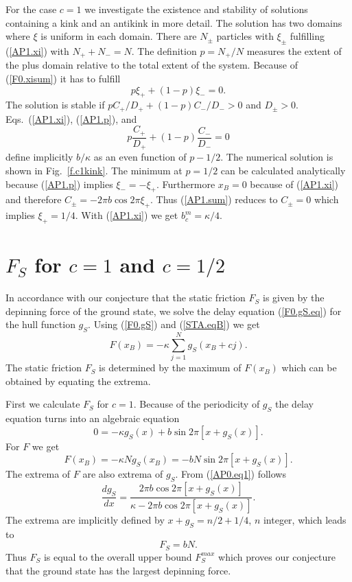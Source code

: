For the case $c=1$ we investigate the existence and stability of
solutions containing a kink and an antikink in more detail. The
solution has two domains where $\xi$ is uniform in each
domain. There are $N_\pm$ particles with $\xi_\pm$ fulfilling
(\ref{AP1.xi}) with $N_++N_-=N$. The definition $p=N_+/N$ measures
the extent of the plus domain relative to the total extent of the
system. Because of (\ref{F0.xisum}) it has to fulfill
\begin{equation}
  p\xi_++(1-p)\xi_-=0.
  \label{AP1.p}
\end{equation}
The solution is stable if $pC_+/D_++(1-p)C_-/D_->0$ and $D_\pm>0$.
Eqs.~(\ref{AP1.xi}), (\ref{AP1.p}), and
\begin{equation}
  p\frac{C_+}{D_+}+(1-p)\frac{C_-}{D_-}=0
  \label{AP1.sum}
\end{equation}
define implicitly $b/\kappa$ as an even function of $p-1/2$. 
The numerical solution is shown in Fig.~\ref{f.c1kink}. The
minimum at $p=1/2$ can be calculated analytically because
(\ref{AP1.p}) implies $\xi_-=-\xi_+$. Furthermore $x_B=0$ because of
(\ref{AP1.xi}) and therefore $C_\pm=-2\pi b\cos 2\pi\xi_+$. Thus
(\ref{AP1.sum}) reduces to $C_\pm=0$ which implies $\xi_+=1/4$. With
(\ref{AP1.xi}) we get $b_c^m=\kappa/4$.

\section{\protect\label{AP0}$F_S$ for \lowercase{$c=1$} and 
\lowercase{$c=1/2$}}

In accordance with our conjecture that the static friction $F_S$ is 
given by the depinning force of the ground state, we solve the
delay equation (\ref{F0.gS.eq}) for the hull function $g_S$. Using
(\ref{F0.gS}) and (\ref{STA.eqB}) we get
\begin{equation}
  F(x_B)=-\kappa\sum_{j=1}^N g_S(x_B+cj).
  \label{AP0.F}
\end{equation}
The static friction $F_S$ is determined by the maximum of $F(x_B)$ 
which can be obtained by equating the extrema.

First we calculate $F_S$ for $c=1$. Because of the periodicity of 
$g_S$ the delay equation turns into an algebraic equation
\begin{equation}
  0=-\kappa g_S(x)+b\sin 2\pi[x+g_S(x)].
  \label{AP0.eq1}
\end{equation}
For $F$ we get
\begin{equation}
  F(x_B)=-\kappa N g_S(x_B)=-bN\sin 2\pi[x+g_S(x)].
  \label{AP0.F1}
\end{equation}
The extrema of $F$ are also extrema of $g_S$. From (\ref{AP0.eq1}) 
follows
\begin{equation}
  \frac{dg_S}{dx}=\frac{2\pi b\cos 2\pi[x+g_S(x)]}{\kappa-2\pi b\cos 
	2\pi[x+g_S(x)]}.
  \label{AP0.gs1}
\end{equation}
The extrema are implicitly defined by $x+g_S=n/2+1/4$, $n$ integer, 
which leads to
\begin{equation}
  F_S=bN.
  \label{AP0.FS1}
\end{equation}
Thus $F_S$ is equal to the overall upper bound $F_S^{max}$
which proves our conjecture that the ground state has the largest
depinning force.

